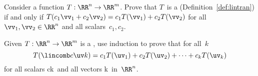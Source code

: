 \begin{exercise} \label{ex:} 
Consider a function \(T:\RR^n\to\RR^m\).  
Prove that \(T\)~is a  (Definition~\ref{def:lintran}) if and only if \(T(c_1\vv_1+c_2\vv_2)=c_1T(\vv_1)+c_2T(\vv_2)\) for all \(\vv_1,\vv_2\in\RR^n\) and all scalars~\(c_1,c_2\).
\end{exercise}



\begin{exercise} \label{ex:genlintran} 
Given \(T:\RR^n\to\RR^m\) is a , use induction to prove that for all~\(k\)
\begin{equation*}
T(\lincomb c\uv k)
=c_1T(\uv_1)+c_2T(\uv_2)+\cdots+c_kT(\uv_k)
\end{equation*}
for all scalars \hlist ck\ and all vectors \hlist \uv k\ in~\(\RR^n\).
\end{exercise}





